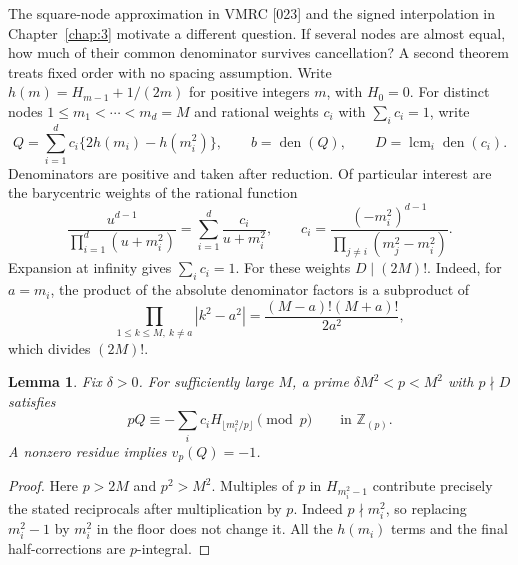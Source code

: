 \documentclass[11pt,a4paper,oneside,openany]{report}
\newtheorem{lemma}[theorem]{Lemma}\newtheorem{proposition}[theorem]{Proposition}
\theoremstyle{remark}\newtheorem{remark}[theorem]{Remark}
\numberwithin{equation}{section}
\begin{document}
The square-node approximation in VMRC [023] and the signed interpolation in Chapter~\ref{chap:3} motivate a different question. If several nodes are almost equal, how much of their common denominator survives cancellation? A second theorem treats fixed order with no spacing assumption. Write $h(m)=H_{m-1}+1/(2m)$ for positive integers $m$, with $H_0=0$.
For distinct nodes $1\le m_1<\cdots<m_d=M$ and rational weights $c_i$
with $\sum_i c_i=1$, write
\[
 Q=\sum_{i=1}^d c_i\{2h(m_i)-h(m_i^2)\},\qquad
 b=\operatorname{den}(Q),\qquad D=\operatorname{lcm}_i\operatorname{den}(c_i).
\]
Denominators are positive and taken after reduction.
Of particular interest are the barycentric weights of the rational
function
\begin{equation}\label{ch4:cg:sum}
 \frac{u^{d-1}}{\prod_{i=1}^d(u+m_i^2)}
 =\sum_{i=1}^d\frac{c_i}{u+m_i^2},\qquad
 c_i=\frac{(-m_i^2)^{d-1}}{\prod_{j\ne i}(m_j^2-m_i^2)}.
\end{equation}
Expansion at infinity gives $\sum_i c_i=1$.
For these weights $D\mid(2M)!$. Indeed, for $a=m_i$, the product of
the absolute denominator factors is a subproduct of
\[
 \prod_{1\le k\le M,\ k\ne a}|k^2-a^2|
 =\frac{(M-a)!(M+a)!}{2a^2},
\]
which divides $(2M)!$.

\begin{lemma}\label{ch4:cg:prime}
Fix $\delta>0$. For sufficiently large $M$, a prime
$\delta M^2<p<M^2$ with $p\nmid D$ satisfies
\[
                pQ\equiv-\sum_i c_iH_{\lfloor m_i^2/p\rfloor}\pmod p
                \qquad\text{in }\mathbb Z_{(p)}.
\]
A nonzero residue implies $v_p(Q)=-1$.
\end{lemma}
\begin{proof}
Here $p>2M$ and $p^2>M^2$. Multiples of $p$ in $H_{m_i^2-1}$
contribute precisely the stated reciprocals after multiplication by
$p$. Indeed $p\nmid m_i^2$, so replacing $m_i^2-1$ by $m_i^2$ in the
floor does not change it. All the $h(m_i)$ terms and the final
half-corrections are $p$-integral.
\end{proof}
\end{document}
